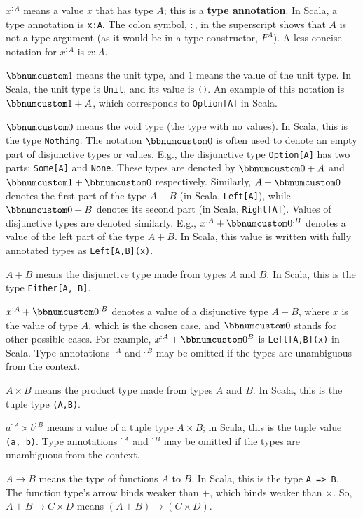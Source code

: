 $x^{:A}$ means a value $x$ that has type $A$; this is a \textbf{type
annotation}. In Scala, a type annotation is \lstinline!x:A!. The
colon symbol, $:$, in the superscript shows that $A$ is not a type
argument (as it would be in a type constructor, $F^{A}$). A less
concise notation for $x^{:A}$ is $x:A$.

$\bbnum 1$ means the unit type, and $1$ means
the value of the unit type. In Scala, the unit type is \lstinline!Unit!,
and its value is \lstinline!()!. An example of this notation is $\bbnum 1+A$,
which corresponds to \lstinline!Option[A]! in Scala.

$\bbnum 0$ means the void type (the type with no
values). In Scala, this is the type \lstinline!Nothing!. The notation
$\bbnum 0$ is often used to denote an empty part of disjunctive types
or values. E.g., the disjunctive type \lstinline!Option[A]! has two
parts: \lstinline!Some[A]! and \lstinline!None!. These types are
denoted by $\bbnum 0+A$ and $\bbnum 1+\bbnum 0$ respectively. Similarly,
$A+\bbnum 0$ denotes the first part of the type $A+B$ (in Scala,
\lstinline!Left[A]!), while $\bbnum 0+B$ denotes its second part
(in Scala, \lstinline!Right[A]!). Values of disjunctive types are
denoted similarly. E.g., $x^{:A}+\bbnum 0^{:B}$ denotes a value of
the left part of the type $A+B$. In Scala, this value is written
with fully annotated types as \lstinline!Left[A,B](x)!.

$A+B$ means the disjunctive type made from types $A$ and $B$. In
Scala, this is the type \texttt{}\lstinline!Either[A, B]!.

$x^{:A}+\bbnum 0^{:B}$ denotes a value of a disjunctive type $A+B$,
where $x$ is the value of type $A$, which is the chosen case, and
$\bbnum 0$ stands for other possible cases. For example, $x^{:A}+\bbnum 0^{B}$
is \lstinline!Left[A,B](x)! in Scala. Type annotations $^{:A}$ and
$^{:B}$ may be omitted if the types are unambiguous from the context.

$A\times B$ means the product type made from types $A$ and $B$.
In Scala, this is the tuple type \lstinline!(A,B)!.

$a^{:A}\times b^{:B}$ means a value of a tuple type $A\times B$;
in Scala, this is the tuple value \lstinline!(a, b)!. Type annotations
$^{:A}$ and $^{:B}$ may be omitted if the types are unambiguous
from the context.

$A\rightarrow B$ means the type of functions $A$ to $B$. In Scala,
this is the type \lstinline!A => B!. The function type\textsf{'}s arrow binds
weaker than $+$, which binds weaker than $\times$. So, $A+B\rightarrow C\times D$
means $(A+B)\rightarrow(C\times D)$.

